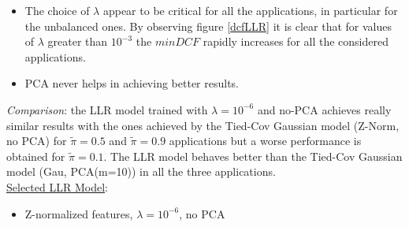 \documentclass[10pt, a4paper, twocolumn]{article} %
\begin{document}
\begin{itemize}
	\item The choice of $\lambda$ appear to be critical for all the applications, in particular for the 
	unbalanced ones. By observing figure \ref{dcfLLR} it is clear that for values of $\lambda$ greater
	than $10^{-3}$ the $minDCF$ rapidly increases for all the considered applications.
	\item PCA never helps in achieving better results.
\end{itemize}
\textit{Comparison}: the LLR model trained with $\lambda=10^{-6}$ and no-PCA achieves really similar results
with the ones achieved by the Tied-Cov Gaussian model (Z-Norm, no PCA) for $\tilde{\pi}=0.5$ and $\tilde{\pi}=0.9$
applications but a worse performance is obtained for $\tilde{\pi}=0.1$. The LLR model behaves better than the
Tied-Cov Gaussian model (Gau, PCA(m=10)) in all the three applications.\\
\underline{Selected LLR Model}: 
\begin{itemize}
	\item Z-normalized features, $\lambda=10^{-6}$, no PCA
\end{itemize}
\end{document}
